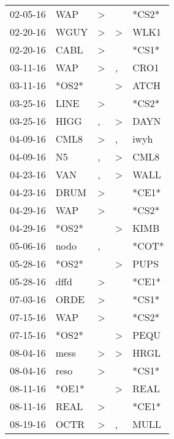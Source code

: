 \begin{supertabular}{lllll}
 02-05-16 &    WAP &     \textgreater &                  &  *CS2* \\
 02-20-16 &   WGUY &     \textgreater &     \textgreater &   WLK1 \\
 02-20-16 &   CABL &     \textgreater &                  &  *CS1* \\
 03-11-16 &    WAP &     \textgreater &                , &   CRO1 \\
 03-11-16 &  *OS2* &                  &     \textgreater &   ATCH \\
 03-25-16 &   LINE &     \textgreater &                  &  *CS2* \\
 03-25-16 &   HIGG &                , &     \textgreater &   DAYN \\
 04-09-16 &   CML8 &     \textgreater &                , &   iwyh \\
 04-09-16 &     N5 &                , &     \textgreater &   CML8 \\
 04-23-16 &    VAN &                , &     \textgreater &   WALL \\
 04-23-16 &   DRUM &     \textgreater &                  &  *CE1* \\
 04-29-16 &    WAP &     \textgreater &                  &  *CS2* \\
 04-29-16 &  *OS2* &                  &     \textgreater &   KIMB \\
 05-06-16 &   nodo &                , &                  &  *COT* \\
 05-28-16 &  *OS2* &                  &     \textgreater &   PUPS \\
 05-28-16 &   dffd &     \textgreater &                  &  *CE1* \\
 07-03-16 &   ORDE &     \textgreater &                  &  *CS1* \\
 07-15-16 &    WAP &     \textgreater &                  &  *CS2* \\
 07-15-16 &  *OS2* &                  &     \textgreater &   PEQU \\
 08-04-16 &   mess &     \textgreater &     \textgreater &   HRGL \\
 08-04-16 &   reso &     \textgreater &                  &  *CS1* \\
 08-11-16 &  *OE1* &                  &     \textgreater &   REAL \\
 08-11-16 &   REAL &     \textgreater &                  &  *CE1* \\
 08-19-16 &   OCTR &     \textgreater &                , &   MULL \\

\end{supertabular}
